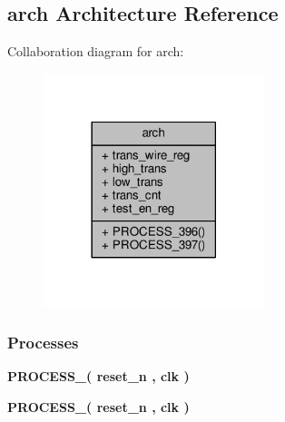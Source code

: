 \subsection{arch Architecture Reference}
\label{classtransition__count_1_1arch}


Collaboration diagram for arch\+:\nopagebreak
\begin{figure}[H]
\begin{center}
\leavevmode
\includegraphics[width=182pt]{d5/d77/classtransition__count_1_1arch__coll__graph}
\end{center}
\end{figure}
\subsubsection*{Processes}
 \begin{DoxyCompactItemize}
\item 
{\bf P\+R\+O\+C\+E\+S\+S\+\_}{\bfseries  ( {\bfseries {\bfseries {\bf reset\+\_\+n}} \textcolor{vhdlchar}{ }} , {\bfseries {\bfseries {\bf clk}} \textcolor{vhdlchar}{ }} )}
\item 
{\bf P\+R\+O\+C\+E\+S\+S\+\_}{\bfseries  ( {\bfseries {\bfseries {\bf reset\+\_\+n}} \textcolor{vhdlchar}{ }} , {\bfseries {\bfseries {\bf clk}} \textcolor{vhdlchar}{ }} )}
\end{DoxyCompactItemize}
